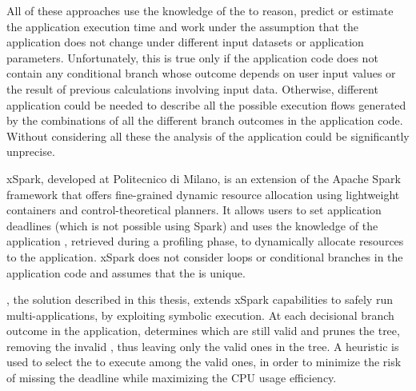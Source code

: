 All of these approaches use the knowledge of the \plan to reason, predict or estimate the application execution time and work under the assumption that the application \plan does not change under different input datasets or application parameters. Unfortunately, this is true only if the application code does not contain any conditional branch whose outcome depends on user input values or the result of previous calculations involving input data. %
Otherwise, different application \plans could be needed to describe all the possible execution flows generated by the combinations of all the different branch outcomes in the application code. Without considering all these \plans the analysis of the application could be significantly unprecise.


xSpark, developed at Politecnico di Milano, is an extension of the Apache Spark framework that offers fine-grained dynamic resource allocation using lightweight containers and control-theoretical planners. It allows users to set application deadlines (which is not possible using Spark) and uses the knowledge of the application \plan, retrieved during a profiling phase, to dynamically allocate resources to the application.
xSpark does not consider loops or conditional branches in the application code and assumes that the \plan is unique.

\tool, the solution described in this thesis, extends xSpark capabilities to safely run multi-\plan applications, by exploiting symbolic execution. At each decisional branch outcome in the application, \tool determines which \plans are still valid and prunes the \plans tree, removing the invalid \plans, thus leaving only the valid ones in the \plans tree. A heuristic is used to select the \plan to execute among the valid ones, in order to minimize the risk of missing the deadline while maximizing the CPU usage efficiency.


